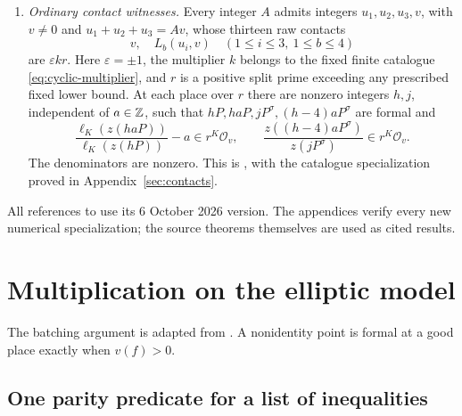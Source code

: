 \documentclass[11pt]{article}
\theoremstyle{definition}
\begin{document}
\begin{enumerate}[label=\textbf{(I\arabic*)},leftmargin=*,itemsep=4pt]
\item \emph{Ordinary contact witnesses.} Every integer \(A\)
admits integers \(u_1,u_2,u_3,v\), with \(v\ne0\) and
\(u_1+u_2+u_3=Av\), whose thirteen raw contacts
\begin{equation}\label{eq:thirteen}
              v,\quad L_b(u_i,v)\quad(1\le i\le3,\ 1\le b\le4)
\end{equation}
are \(\varepsilon kr\). Here \(\varepsilon=\pm1\), the
multiplier \(k\) belongs to the fixed finite catalogue
\eqref{eq:cyclic-multiplier}, and \(r\) is a positive split prime
exceeding any prescribed fixed lower bound. At each place over \(r\)
there are nonzero integers \(h,j\), independent of \(a\in\mathbb Z\),
such that \(hP,haP,jP^\sigma,(h-4)aP^\sigma\) are formal and
\begin{equation}\label{eq:ordinary-tests}
 \frac{\ell_K(z(haP))}{\ell_K(z(hP))}-a\in r^K\mathcal O_v,
 \qquad
 \frac{z((h-4)aP^\sigma)}{z(jP^\sigma)}\in r^K\mathcal O_v.
\end{equation}
The denominators are nonzero. This is
\cite[Corollaries 2.6 and 6.2, using Lemma 6.1]{H10}, with the
catalogue specialization proved in Appendix~\ref{sec:contacts}.
\end{enumerate}

All references to \cite{H10} use its 6 October 2026 version.
The appendices verify every new numerical specialization; the source
theorems themselves are used as cited results.

\section{Multiplication on the elliptic model}
\label{sec:simultaneous}\label{sec:multiplication}

The batching argument is adapted from \cite{ConantArity}. A
nonidentity point is formal at a good place exactly when \(v(f)>0\).

\subsection{One parity predicate for a list of inequalities}
\end{document}
